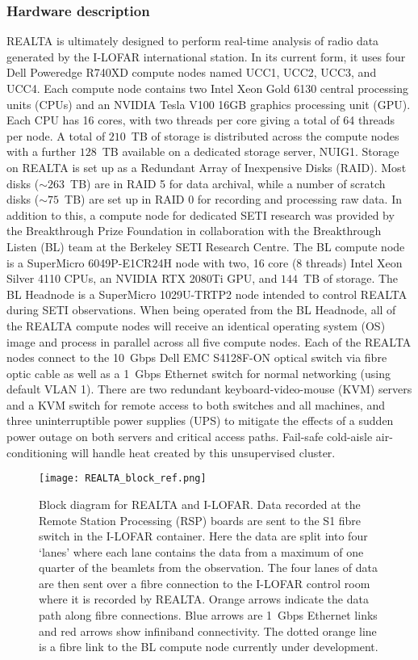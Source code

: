 \subsubsection{Hardware description}
REALTA is ultimately designed to perform real-time analysis of radio data generated by the I-LOFAR international station. In its current form, it uses four Dell Poweredge R740XD compute nodes named UCC1, UCC2, UCC3, and UCC4. Each compute node contains two Intel Xeon\textsuperscript{\textregistered} Gold 6130 central processing units (CPUs) and an NVIDIA Tesla V100 16GB graphics processing unit (GPU). Each CPU has 16 cores, with two threads per core giving a total of 64 threads per node.  A total of $210$~TB of storage is distributed across the compute nodes with a further $128$~TB available on a dedicated storage server, NUIG1. Storage on REALTA is set up as a Redundant Array of Inexpensive Disks (RAID). Most disks ($\sim 263$~TB) are in RAID 5 for data archival, while a number of scratch disks ($\sim 75$~TB) are set up in RAID 0 for recording and processing raw data. In addition to this, a compute node for dedicated SETI research was provided by the Breakthrough Prize Foundation in collaboration with the Breakthrough Listen (BL) team at the Berkeley SETI Research Centre. The BL compute node is a SuperMicro 6049P-E1CR24H node with two, 16 core (8 threads) Intel Xeon\textsuperscript{\textregistered} Silver 4110 CPUs, an NVIDIA RTX 2080Ti GPU, and $144$~TB of storage. The BL Headnode is a SuperMicro 1029U-TRTP2 node intended to control REALTA during SETI observations. When being operated from the BL Headnode, all of the REALTA compute nodes will receive an identical operating system (OS) image and process in parallel across all five compute nodes. Each of the REALTA nodes connect to the 10~Gbps Dell EMC S4128F-ON optical switch via fibre optic cable as well as a 1~Gbps Ethernet switch for normal networking (using default VLAN 1). There are two redundant keyboard-video-mouse (KVM) servers and a KVM switch for remote access to both switches and all machines, and three uninterruptible power supplies (UPS) to mitigate the effects of a sudden power outage on both servers and critical access paths. Fail-safe cold-aisle air-conditioning will handle heat created by this unsupervised cluster.

\begin{figure*}[h]
    \centering
    \texttt{[image: REALTA\_block\_ref.png]}
    \caption[Block diagram for REALTA and I-LOFAR.]{Block diagram for REALTA and I-LOFAR. Data recorded at the Remote Station Processing (RSP) boards are sent to the S1 fibre switch in the I-LOFAR container. Here the data are split into four `lanes' where each lane contains the data from a maximum of one quarter of the beamlets from the observation. The four lanes of data are then sent over a fibre connection to the I-LOFAR control room where it is recorded by REALTA. Orange arrows indicate the data path along fibre connections. Blue arrows are 1~Gbps Ethernet links and red arrows show infiniband connectivity. The dotted orange line is a fibre link to the BL compute node currently under development.}
    \label{fig:block}
\end{figure*}

